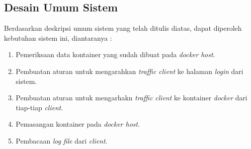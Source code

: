     \subsection{Desain Umum Sistem}
      \indent Berdasarkan deskripsi umum sistem yang telah ditulis diatas, dapat diperoleh kebutuhan sistem ini, diantaranya :
        \begin{enumerate}
        \item Pemeriksaan data kontainer yang sudah dibuat pada \textit{docker host}.
        \item Pembuatan aturan untuk mengarahkan \textit{traffic client} ke halaman \textit{login} dari sistem.
        \item Pembuatan aturan untuk mengarhakn \textit{traffic client} ke kontainer \textit{docker} dari tiap-tiap \textit{client}.
        \item Pemasangan kontainer pada \textit{docker host}.
        \item Pembacaan \textit{log file} dari \textit{client}.
        \end{enumerate} 
      
